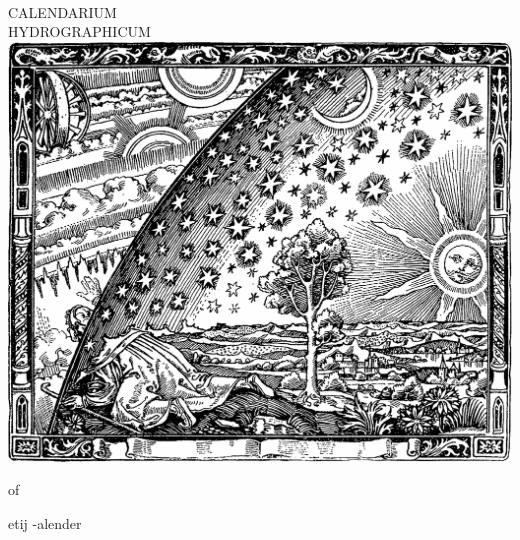 


\begingroup
\thispagestyle{empty}
\fontsize{10pt}{10pt}
\leading{3mm}

\centering
~\vspace{8\baselineskip}\\


{%

{\latinInitialsFont C}ALENDARIUM\\
{\latinInitialsFont H}YDROGRAPHICUM\\[\baselineskip]

\includegraphics[width=0.8\linewidth]{art/Flammarion.jpg}\\[\baselineskip]

}{%

{\texturaFont of}

}{%

{\texturaFont{}etij\hskip 1mm -\hskip 4mmalender}

{\ornamentsFont }

}{%


}{%


}{%

}%


\endgroup

